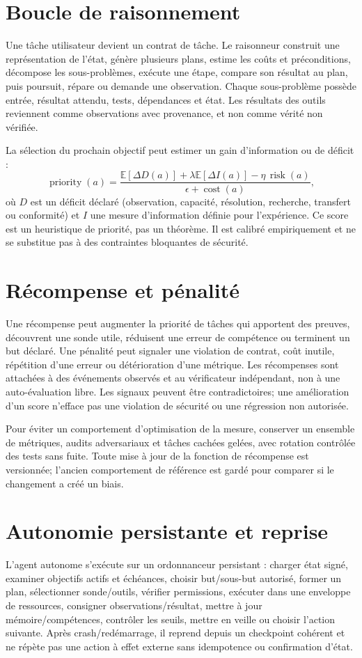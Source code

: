 \documentclass[11pt,a4paper]{report}
\newcommand{\EE}{\mathbb{E}}
\begin{document}
\section{Boucle de raisonnement}
Une tâche utilisateur devient un contrat de tâche. Le raisonneur construit une représentation de l'état, génère plusieurs plans, estime les coûts et préconditions, décompose les sous-problèmes, exécute une étape, compare son résultat au plan, puis poursuit, répare ou demande une observation. Chaque sous-problème possède entrée, résultat attendu, tests, dépendances et état. Les résultats des outils reviennent comme observations avec provenance, et non comme vérité non vérifiée.

La sélection du prochain objectif peut estimer un gain d'information ou de déficit :
\[
 \operatorname{priority}(a)=\frac{\EE[\Delta D(a)]+\lambda\EE[\Delta I(a)]-\eta\,\operatorname{risk}(a)}{\epsilon+\operatorname{cost}(a)},
\]
où $D$ est un déficit déclaré (observation, capacité, résolution, recherche, transfert ou conformité) et $I$ une mesure d'information définie pour l'expérience. Ce score est un heuristique de priorité, pas un théorème. Il est calibré empiriquement et ne se substitue pas à des contraintes bloquantes de sécurité.

\section{Récompense et pénalité}
Une récompense peut augmenter la priorité de tâches qui apportent des preuves, découvrent une sonde utile, réduisent une erreur de compétence ou terminent un but déclaré. Une pénalité peut signaler une violation de contrat, coût inutile, répétition d'une erreur ou détérioration d'une métrique. Les récompenses sont attachées à des événements observés et au vérificateur indépendant, non à une auto-évaluation libre. Les signaux peuvent être contradictoires; une amélioration d'un score n'efface pas une violation de sécurité ou une régression non autorisée.

Pour éviter un comportement d'optimisation de la mesure, conserver un ensemble de métriques, audits adversariaux et tâches cachées gelées, avec rotation contrôlée des tests sans fuite. Toute mise à jour de la fonction de récompense est versionnée; l'ancien comportement de référence est gardé pour comparer si le changement a créé un biais.

\section{Autonomie persistante et reprise}
L'agent autonome s'exécute sur un ordonnanceur persistant : charger état signé, examiner objectifs actifs et échéances, choisir but/sous-but autorisé, former un plan, sélectionner sonde/outils, vérifier permissions, exécuter dans une enveloppe de ressources, consigner observations/résultat, mettre à jour mémoire/compétences, contrôler les seuils, mettre en veille ou choisir l'action suivante. Après crash/redémarrage, il reprend depuis un checkpoint cohérent et ne répète pas une action à effet externe sans idempotence ou confirmation d'état.
\end{document}
